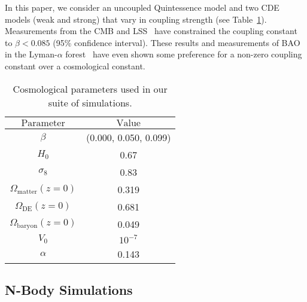 \documentclass[a4paper,fleqn,usenatbib]{mnras}
\begin{document}
In this paper, we consider an uncoupled Quintessence model and two CDE models (weak and strong) that vary in coupling strength (see Table~\ref{tab:params}). Measurements from the CMB and LSS~\citep{2009PhRvD..80j3514X} have constrained the coupling constant to  $\beta < 0.085$ (95\% confidence interval). These results and measurements of BAO in the Lyman-$\alpha$ forest~\citep{2017PhRvD..95d3520F} have even shown some preference for a non-zero coupling constant over a cosmological constant.

\begin{table}
	\centering
	\caption{Cosmological parameters used in our suite of simulations.}
	\label{tab:params}
	\begin{tabular}{  c c } %
		\hline
		 $\mathrm{Parameter}$ & $\mathrm{Value}$ \\
		\hline %
		$\beta$ & (0.000, 0.050, 0.099) \\
		 $H_0$ &  0.67 \\
		$\sigma_8$ & 0.83 \\
		$\Omega_{\mathrm{matter}} (z=0)$ & 0.319 \\
		$\Omega_{\mathrm{DE}} (z=0)$ & 0.681 \\
		$\Omega_{\mathrm{baryon}} (z=0)$ & 0.049 \\
		$V_0$ & $10^{-7}$ \\
		$\alpha$ & 0.143 \\
		\hline
	\end{tabular}
\end{table}



\subsection{N-Body Simulations}
\label{sec: simul}
\end{document}
